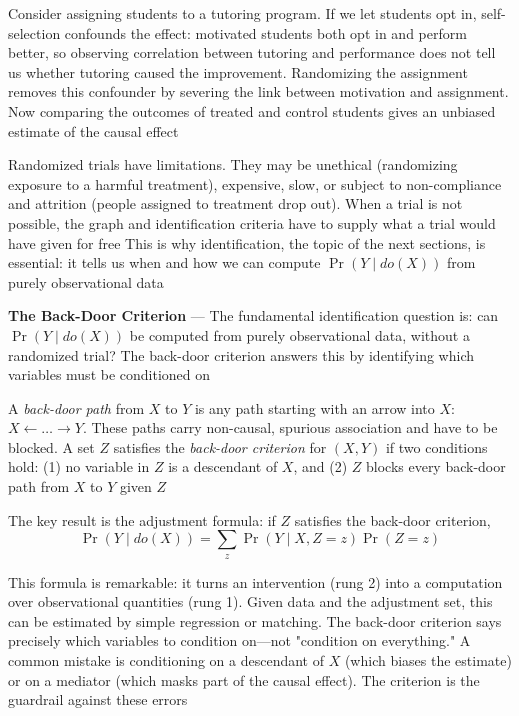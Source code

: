 Consider assigning students to a tutoring program. If we let students opt in,
self-selection confounds the effect: motivated students both opt in and perform better,
so observing correlation between tutoring and performance does not tell us
whether tutoring caused the improvement. Randomizing the assignment removes this
confounder by severing the link between motivation and assignment. Now comparing
the outcomes of treated and control students gives an unbiased estimate of the
causal effect

Randomized trials have limitations. They may be unethical (randomizing exposure to
a harmful treatment), expensive, slow, or subject to non-compliance and attrition
(people assigned to treatment drop out). When a trial is not possible, the graph
and identification criteria have to supply what a trial would have given for free
This is why identification, the topic of the next sections, is essential: it tells
us when and how we can compute $\Pr(Y \mid do(X))$ from purely observational data

\textbf{The Back-Door Criterion} --- The fundamental identification question is:
can $\Pr(Y \mid do(X))$ be computed from purely observational data, without a randomized
trial? The back-door criterion answers this by identifying which variables must
be conditioned on

A \emph{back-door path} from $X$ to $Y$ is any path starting with an arrow into
$X$: $X \leftarrow \ldots \rightarrow Y$. These paths carry non-causal, spurious
association and have to be blocked. A set $Z$ satisfies the \emph{back-door
criterion} for $(X, Y)$ if two conditions hold: (1) no variable in $Z$ is a
descendant of $X$, and (2) $Z$ blocks every back-door path from $X$ to $Y$ given
$Z$

The key result is the adjustment formula: if $Z$ satisfies the back-door criterion,
\begin{equation}
  \Pr(Y \mid do(X)) = \sum_{z}\Pr(Y \mid X, Z = z) \Pr(Z = z) \label{eq:backdoor-adjustment}
\end{equation}

This formula is remarkable: it turns an intervention (rung 2) into a computation
over observational quantities (rung 1). Given data and the adjustment set, this
can be estimated by simple regression or matching. The back-door criterion says precisely
which variables to condition on—not "condition on everything." A common mistake
is conditioning on a descendant of $X$ (which biases the estimate) or on a
mediator (which masks part of the causal effect). The criterion is the guardrail
against these errors

